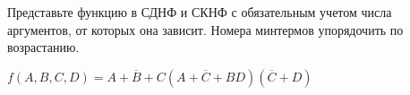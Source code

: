 \question Представьте функцию в СДНФ и СКНФ с обязательным учетом числа аргументов,
 от которых она зависит. Номера минтермов упорядочить по возрастанию.

$f(A,B,C,D) = \overline{A+B+C}(A+\overline{C}+BD)(\overline{C}+D)$